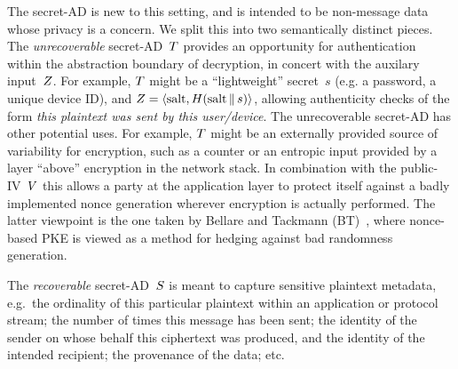 The secret-AD is new to this setting, and is intended to be non-message data whose privacy is a concern.  
We split this into two semantically distinct pieces.
The \emph{unrecoverable} secret-AD~$T$ provides an opportunity for authentication within the abstraction boundary of decryption, in concert with the auxilary input~$Z$.  
For example, $T$ might be a ``lightweight'' secret~$s$ (e.g. a password, a unique device ID), and $Z=\langle \mathrm{salt},H(\mathrm{salt} \,\|\, s) \rangle$, allowing authenticity checks of the form \emph{this plaintext was sent by this user/device}. 
%
The unrecoverable secret-AD has other potential uses.  For example, $T$ might be an externally provided source of variability for encryption, such as a counter or an entropic input provided by a layer ``above'' encryption in the network stack.  In combination with the public-IV~$V$ this allows a party at the application layer to protect itself against a badly implemented nonce generation wherever encryption is actually performed.  %
The latter viewpoint is the one taken by Bellare and Tackmann (BT)~\cite{BellareTackmann}, where nonce-based PKE is viewed as a method for hedging against bad randomness generation.

The \emph{recoverable} secret-AD~$S$ is meant to capture sensitive plaintext metadata, e.g.\ the ordinality of this particular plaintext within an application or protocol stream; the number of times this message has been sent; the identity of the sender on whose behalf this ciphertext was produced, and the identity of the intended recipient; the provenance of the data; etc. 

